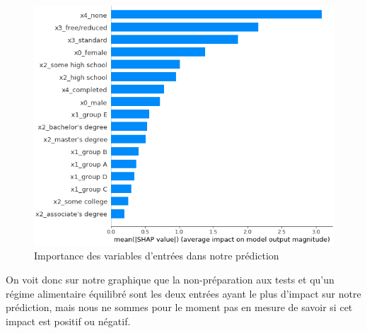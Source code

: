\begin{figure}[h]
    \includegraphics[scale=0.6]{src_img/shapPlotBar.png}
    \caption{Importance des variables d'entrées dans notre prédiction}
    \label{shapPlotBar}
\end{figure}

On voit donc sur notre graphique que la non-préparation aux tests et qu'un régime alimentaire équilibré sont les deux entrées ayant le plus d'impact sur notre prédiction, mais nous ne sommes pour le moment pas en mesure de savoir si cet impact est positif ou négatif.


